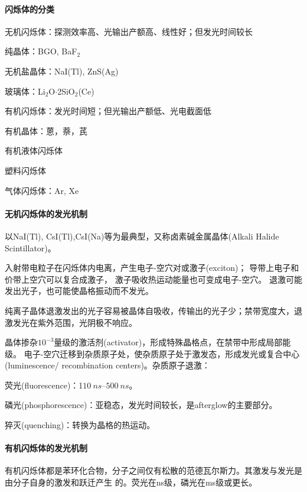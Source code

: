 \paragraph{闪烁体的分类}
\begin{compactitem}
	\item 无机闪烁体：探测效率高、光输出产额高、线性好；但发光时间较长
	\begin{compactitem}
		\item 纯晶体：BGO, BaF$_2$
		\item 无机盐晶体：NaI(Tl), ZnS(Ag)
		\item 玻璃体：Li$_2$O$·$2SiO$_2$(Ce)
	\end{compactitem}
	\item 有机闪烁体：发光时间短；但光输出产额低、光电截面低
	\begin{compactitem}
		\item 有机晶体：蒽，萘，芪
		\item 有机液体闪烁体
		\item 塑料闪烁体
	\end{compactitem}
	\item 气体闪烁体：Ar, Xe
\end{compactitem}
\paragraph{无机闪烁体的发光机制}
以NaI(Tl), CsI(Tl),CsI(Na)等为最典型，又称卤素碱金属晶体(Alkali Halide Scintillator)。

入射带电粒子在闪烁体内电离，产生电子-空穴对或激子(exciton)；
导带上电子和价带上空穴可以复合成激子，
激子吸收热运动能量也可变成电子-空穴。
退激可能发出光子，也可能使晶格振动而不发光。

纯离子晶体退激发出的光子容易被晶体自吸收，传输出的光子少；禁带宽度大，退激发光在紫外范围，光阴极不响应。

晶体掺杂$10^{-3}$量级的激活剂(activator)，形成特殊晶格点，在禁带中形成局部能级。
电子-空穴迁移到杂质原子处，使杂质原子处于激发态，形成发光或复合中心(luminescence/ recombination centers)。杂质原子退激：
\begin{compactitem}
	\item 荧光(fluorescence)：1$\SIrange{10}{500}{ns}$。
	\item 磷光(phosphorescence)：亚稳态，发光时间较长，是afterglow的主要部分。
	\item 猝灭(quenching)：转换为晶格的热运动。
\end{compactitem}
\paragraph{有机闪烁体的发光机制}
有机闪烁体都是苯环化合物，分子之间仅有松散的范德瓦尔斯力。其激发与发光是由分子自身的激发和跃迁产生
的。荧光在ns级，磷光在ms级或更长。

